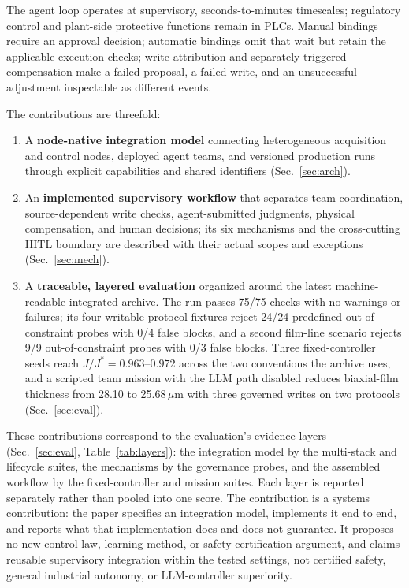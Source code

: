 The agent loop operates at supervisory, seconds-to-minutes timescales; regulatory control and plant-side protective functions remain in PLCs. Manual bindings require an approval decision; automatic bindings omit that wait but retain the applicable execution checks; write attribution and separately triggered compensation make a failed proposal, a failed write, and an unsuccessful adjustment inspectable as different events.

The contributions are threefold:
\begin{enumerate}
\item A \textbf{node-native integration model} connecting heterogeneous acquisition and control nodes, deployed agent teams, and versioned production runs through explicit capabilities and shared identifiers (Sec.~\ref{sec:arch}).
\item An \textbf{implemented supervisory workflow} that separates team coordination, source-dependent write checks, agent-submitted judgments, physical compensation, and human decisions; its six mechanisms and the cross-cutting HITL boundary are described with their actual scopes and exceptions (Sec.~\ref{sec:mech}).
\item A \textbf{traceable, layered evaluation} organized around the latest
machine-readable integrated archive. The run passes 75/75 checks with no
warnings or failures; its four writable protocol fixtures reject 24/24
predefined out-of-constraint probes with 0/4 false blocks, and a second film-line scenario rejects 9/9 out-of-constraint probes with 0/3 false blocks. Three
fixed-controller seeds reach $J/J^*=0.963$--$0.972$ across the two conventions
the archive uses, and a scripted team mission with the LLM path disabled
reduces biaxial-film thickness from 28.10 to 25.68\,$\mu$m with three governed
writes on two protocols (Sec.~\ref{sec:eval}).
\end{enumerate}
These contributions correspond to the evaluation's evidence layers
(Sec.~\ref{sec:eval}, Table~\ref{tab:layers}): the integration model by the
multi-stack and lifecycle suites, the mechanisms by the governance probes, and the
assembled workflow by the fixed-controller and mission suites. Each layer is
reported separately rather than pooled into one score. The contribution is a
systems contribution: the paper specifies an integration model, implements it end
to end, and reports what that implementation does and does not guarantee. It
proposes no new control law, learning method, or safety certification argument, and
claims reusable supervisory integration within the tested settings, not certified
safety, general industrial autonomy, or LLM-controller superiority.
